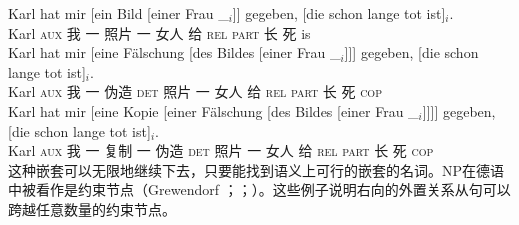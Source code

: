 \eal
\ex 
\gll Karl hat mir [ein Bild [einer Frau \_$_i$]] gegeben, [die schon lange tot ist]$_i$.\\
     Karl \textsc{aux} 我  \spacebr{}一 照片  \spacebr{}一 女人 {} 给 \spacebr{}\textsc{rel} \textsc{part} 长 死 is\\
\ex 
\gll Karl hat          mir [eine Fälschung [des Bildes                 [einer Frau \_$_i$]]] gegeben, [die schon lange tot ist]$_i$.\\
     Karl \textsc{aux} 我  \spacebr{}一 伪造 \spacebr{}\textsc{det} 照片 \spacebr{}一 女人 {} 给 \spacebr{}\textsc{rel} \textsc{part} 长 死 \textsc{cop}\\
\ex 
\gll Karl hat mir [eine Kopie [einer Fälschung [des Bildes [einer Frau \_$_i$]]]] gegeben, [die schon lange tot ist]$_i$.\\
	 Karl \textsc{aux} 我 \spacebr{}一 复制 \spacebr{}一 伪造 \spacebr{}\textsc{det} 照片 \spacebr{}一 女人 {} 给 \spacebr{}\textsc{rel} \textsc{part} 长 死 \textsc{cop}\\
\zl
这种嵌套可以无限地继续下去，只要能找到语义上可行的嵌套的名词。NP在德语中被看作是约束节点（Grewendorf \citeyear[]{Grewendorf88a}；\citeyear[--18]{Grewendorf2002a}；\citealp[]{Haider2001a}）。这些例子说明右向的外置关系从句可以跨越任意数量的约束节点。

